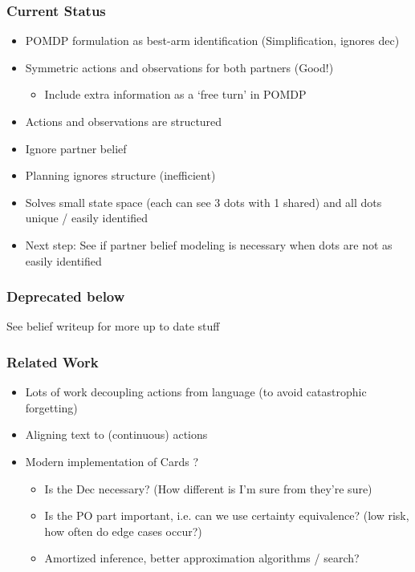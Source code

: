 \documentclass{beamer}
\begin{document}
\begin{frame}
\frametitle{Current Status}
\begin{itemize}
\item POMDP formulation as best-arm identification (Simplification, ignores dec)
\item Symmetric actions and observations for both partners (Good!)
    \begin{itemize}
    \item Include extra information as a `free turn' in POMDP
    \end{itemize}
\item Actions and observations are structured
\item Ignore partner belief
\item Planning ignores structure (inefficient)
\item Solves small state space (each can see 3 dots with 1 shared) and
    all dots unique / easily identified
\item Next step: See if partner belief modeling is necessary
    when dots are not as easily identified
\end{itemize}
\end{frame}

\begin{frame}
\frametitle{Deprecated below}
See belief writeup for more up to date stuff
\end{frame}

\begin{frame}
\frametitle{Related Work}
\begin{itemize}
\item Lots of work decoupling actions from language (to avoid catastrophic forgetting)
\item Aligning text to (continuous) actions \citep{latentactions}
\item Modern implementation of Cards \citep{cards}?
    \begin{itemize}
    \item Is the Dec necessary? (How different is I'm sure from they're sure) 
    \item Is the PO part important, i.e. can we use certainty equivalence?
        (low risk, how often do edge cases occur?)
    \item Amortized inference, better approximation algorithms / search?
    \end{itemize}
\end{itemize}
\end{frame}
\end{document}
